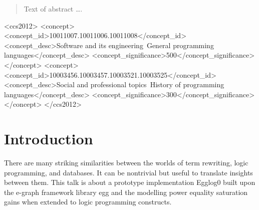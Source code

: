 \documentclass[sigplan,10pt,review,anonymous]{acmart}
\begin{document}
\begin{abstract}
Text of abstract \ldots.
\end{abstract}


\begin{CCSXML}
<ccs2012>
<concept>
<concept_id>10011007.10011006.10011008</concept_id>
<concept_desc>Software and its engineering~General programming languages</concept_desc>
<concept_significance>500</concept_significance>
</concept>
<concept>
<concept_id>10003456.10003457.10003521.10003525</concept_id>
<concept_desc>Social and professional topics~History of programming languages</concept_desc>
<concept_significance>300</concept_significance>
</concept>
</ccs2012>
\end{CCSXML}





\maketitle


\section{Introduction}
There are many striking similarities between the worlds of term rewriting, logic programming, and databases. It can be nontrivial but useful to translate insights between them. This talk is about a prototype implementation Egglog0 built upon the e-graph framework library egg and the modelling power equality saturation gains when extended to logic programming constructs.
\end{document}
